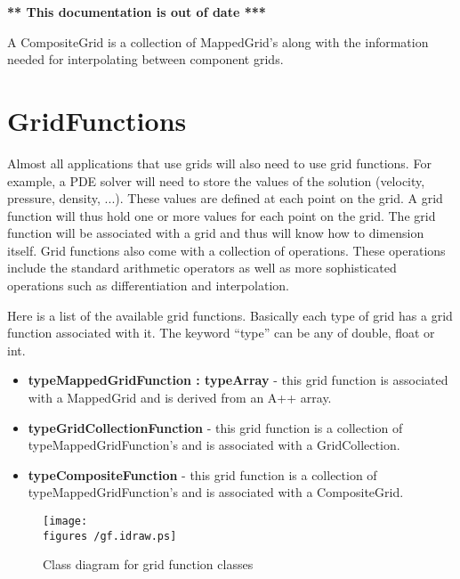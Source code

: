 \documentclass{article}
\newcommand{\figures}{\homeHenshaw/OvertureFigures}
\begin{document}
{\bf ***  This documentation is out of date *** }

A CompositeGrid is a collection of MappedGrid's along with the information needed
for interpolating between component grids.
 



\vfill\eject
\section{GridFunctions}

Almost all applications that use grids will also need to use grid functions.
For example, a PDE solver will need to store the values of the solution
(velocity, pressure, density, ...). These values are defined at each
point on the grid. A grid function will thus hold one or more values
for each point on the grid. The grid function will be associated with 
a grid and thus will know how to dimension itself. Grid functions
also come with a collection of operations. These operations include the standard
arithmetic operators as well as more sophisticated operations such as
differentiation and interpolation.


Here is a list of the available grid functions. Basically each type of
grid has a grid function associated with it.
The keyword ``{\ff type}''
can be any of {\ff double}, {\ff float} or {\ff int}.
\begin{itemize}
  \item {\bf typeMappedGridFunction : typeArray} - this grid function
    is associated with a {\ff MappedGrid} and is derived from an 
    A++ array.
  \item {\bf typeGridCollectionFunction} - this grid function is 
     a collection of {\ff typeMappedGridFunction}'s and is associated
     with a {\ff GridCollection}.
  \item {\bf typeCompositeFunction} - this grid function is 
     a collection of {\ff typeMappedGridFunction}'s and is associated
     with a {\ff CompositeGrid}.
\end{itemize}

\begin{figure} \label{fig:GridFunctions}
  \begin{center}
  \texttt{[image: \\figures /gf.idraw.ps]}
  \caption{Class diagram for grid function classes}
  \end{center}
\end{figure}
\end{document}
